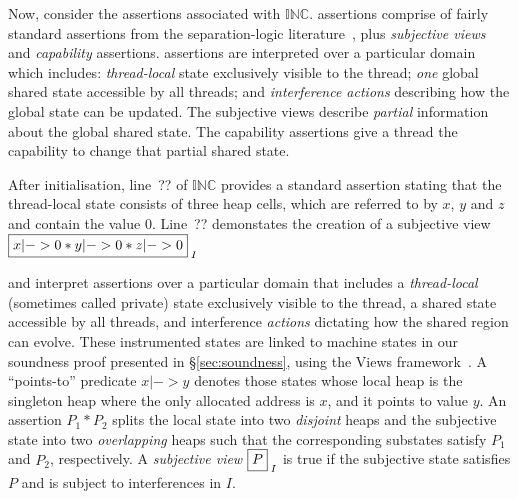 


Now, consider the \colosl assertions associated with $\mathbb{INC}$.
\colosl assertions comprise of fairly standard assertions from the
separation-logic literature~\cite{rey02,sepish,variablesasresource},
plus {\em subjective views} and {\em capability} assertions. \colosl
assertions are interpreted over a particular domain which includes:
{\em thread-local} state exclusively visible to the thread; {\em one}
global shared state accessible by all threads; and {\em  interference
actions}  describing how the global state can be updated. The
subjective views describe {\em partial} information about the global
shared state. The capability assertions give a thread the capability
to change that partial shared state.




After
initialisation, line~?? of $\mathbb{INC}$  provides a standard assertion stating that 
the thread-local state consists of three  heap cells,  which are referred to by  $x$,
$y$ and $z$ and contain the value  $0$. Line~?? demonstates the
creation of a subjective view $\shared{x|-> 0 * y|-> 0 * z|-> 0}I$



and interpret \colosl assertions over a particular domain that
includes a \emph{thread-local} (sometimes called private) state
exclusively visible to the thread, a shared state accessible by all
threads, and interference \emph{actions} dictating how the shared
region can evolve. These instrumented states are linked to machine
states in our soundness proof presented in \S\ref{sec:soundness},
using the Views framework~\cite{views}. A ``points-to'' predicate $x
|-> y$ denotes those states whose local heap is the singleton heap
where the only allocated address is $x$, and it points to value
$y$. An assertion $P_1 * P_2$ splits the local state into two
\emph{disjoint} heaps and the subjective state into two
\emph{overlapping} heaps such that the corresponding substates satisfy
$P_1$ and $P_2$, respectively. A \emph{subjective view}
$\shared{P}{I}$ is true if the subjective state satisfies $P$ and is
subject to interferences in $I$.

